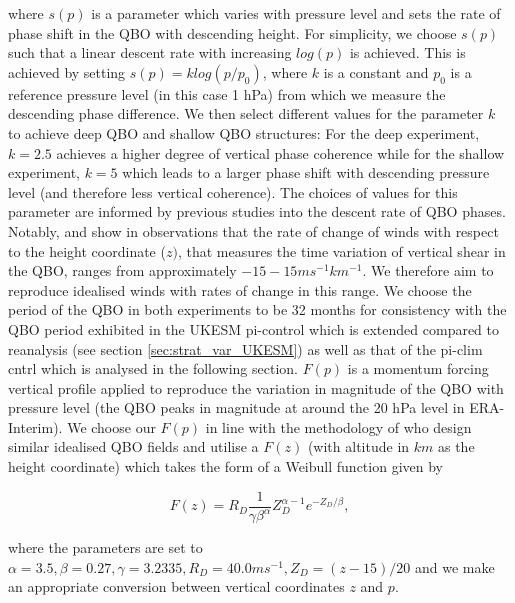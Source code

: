 \noindent where $s(p)$ is a parameter which varies with pressure level and sets the rate of phase shift in the QBO with descending height. For simplicity, we choose $s(p)$ such that a linear descent rate with increasing $log(p)$ is achieved. This is achieved by setting $s(p) = k log(p/p_{0})$, where $k$ is a constant and $p_{0}$ is a reference pressure level (in this case 1 hPa) from which we measure the descending phase difference. We then select different values for the parameter $k$ to achieve deep QBO and shallow QBO structures: For the deep experiment, $k = 2.5$ achieves a higher degree of vertical phase coherence while for the shallow experiment, $k = 5$ which leads to a larger phase shift with descending pressure level (and therefore less vertical coherence). The choices of values for this parameter are informed by previous studies into the descent rate of QBO phases. Notably, \cite{kinnersleyDescent1996} and \cite{coySeasonal2020} show in observations that the rate of change of winds with respect to the height coordinate ($z)$, that measures the time variation of vertical shear in the QBO, ranges from approximately $-15-15ms^{-1}km^{-1}$. We therefore aim to reproduce idealised winds with rates of change in this range. We choose the period of the QBO in both experiments to be 32 months for consistency with the QBO period exhibited in the UKESM pi-control which is extended compared to reanalysis (see section \ref{sec:strat_var_UKESM}) as well as that of the pi-clim cntrl which is analysed in the following section. $F(p)$ is a momentum forcing vertical profile applied to reproduce the variation in magnitude of the QBO with pressure level (the QBO peaks in magnitude at around the 20 hPa level in ERA-Interim). We choose our $F(p)$ in line with the methodology of \cite{pascoeQuasibiennial2005b} who design similar idealised QBO fields and utilise a $F(z)$ (with altitude in $km$ as the height coordinate) which takes the form of a Weibull function given by

\begin{equation} \label{eq:vertical_profile}
F(z) = R_D \frac{1}{\gamma \beta^\alpha}  Z_D^{\alpha-1}  e^{-Z_D/\beta},
\end{equation}

\noindent where the parameters are set to $\alpha = 3.5, \beta = 0.27, \gamma = 3.2335, R_D = 40.0 ms^{-1}, Z_{D} = (z - 15)/20$ and we make an appropriate conversion between vertical coordinates $z$ and $p$.

